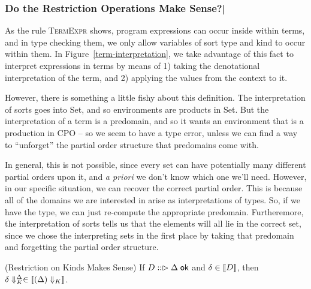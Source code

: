 \subsubsection{Do the Restriction Operations Make Sense?|}

As the rule \textsc{TermExpr} shows, program expressions can occur
inside within terms, and in type checking them, we only allow
variables of sort type and kind to occur within them. In
Figure~\ref{term-interpretation}, we take advantage of this fact to
interpret expressions in terms by means of 1) taking the denotational
interpretation of the term, and 2) applying the values from the
context to it.

However, there is something a little fishy about this definition.  The
interpretation of sorts goes into Set, and so environments are
products in Set. But the interpretation of a term is a predomain, and
so it wants an environment that is a production in CPO -- so we seem
to have a type error, unless we can find a way to ``unforget'' the
partial order structure that predomains come with. 

In general, this is not possible, since every set can have potentially
many different partial orders upon it, and \emph{a priori} we don't
know which one we'll need. However, in our specific situation, we can
recover the correct partial order. This is because all of the domains
we are interested in arise as interpretations of types. So, if we have
the type, we can just re-compute the appropriate predomain. Furtheremore, the
interpretation of sorts tells us that the elements will all lie in the
correct set, since we chose the interpreting sets in the first place by 
taking that predomain and forgetting the partial order structure. 

\begin{lemma}{(Restriction on Kinds Makes Sense)}
If $D :: \vartriangleright {\Delta} \;\mathsf{ok}$ and $\delta \in [\![{D}]\!]$, then 
${\delta}\Downarrow^{\Delta}_K \in [\![{({\Delta})\Downarrow_K}]\!]$. 
\end{lemma}


